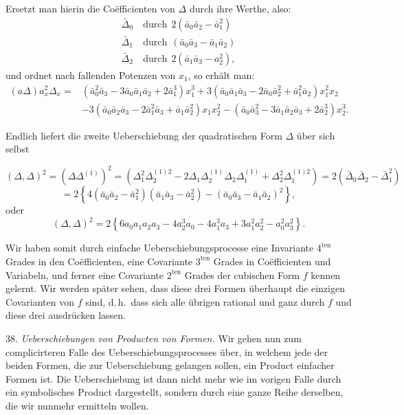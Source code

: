 \documentclass[11pt]{article}
\providecommand{\gesperrt}[1]{\textls[130]{#1}}
\providecommand{\weberpage}[1]{}
\providecommand{\weq}[2]{\begin{equation}\tag{#1}#2\end{equation}}
\let\Delta\varDelta
\begin{document}
Ersetzt man hierin die Co\"efficienten von $\Delta$ durch ihre Werthe,
also:
\[
\begin{aligned}
\bar\Delta_0 &\ \text{durch}\ \ 2(\bar a_0\bar a_2-\bar a_1^2)\\
\bar\Delta_1 &\ \text{durch}\ \ (\bar a_0\bar a_3-\bar a_1\bar a_2)\\
\bar\Delta_2 &\ \text{durch}\ \ 2(\bar a_1\bar a_3-a_2^2),
\end{aligned}
\]
und ordnet nach fallenden Potenzen von $x_1$, so erhält man:
\weq{5}{
\begin{aligned}
(a\Delta)a_x^2\Delta_x={}&(\bar a_0^2\bar a_3-3\bar a_0\bar a_1\bar a_2+2\bar a_1^3)x_1^3+3(\bar a_0\bar a_1\bar a_3-2\bar a_0\bar a_2^2+\bar a_1^2\bar a_2)x_1^2x_2\\
&-3(\bar a_0\bar a_2\bar a_3-2\bar a_1^2\bar a_3+\bar a_1\bar a_2^2)x_1x_2^2-(\bar a_0\bar a_3^2-3\bar a_1\bar a_2\bar a_3+2\bar a_2^3)x_2^3.
\end{aligned}
}

Endlich liefert die zweite Ueberschiebung der quadratischen Form
$\Delta$ über sich selbst


\weberpage{39}
\[
(\Delta, \Delta)^2=(\Delta \Delta^{(1)})^2=(\Delta_1^2\Delta_2^{(1)2}-2\Delta_1\Delta_2^{(1)}\Delta_2\Delta_1^{(1)}+\Delta_2^2\Delta_1^{(1)2})=2(\bar\Delta_0\bar\Delta_2-\bar\Delta_1^2)
\]
\[
=2\left\{4(\bar a_0\bar a_2-\bar a_1^2)(\bar a_1\bar a_3-\bar a_2^2)-(\bar a_0\bar a_3-\bar a_1\bar a_2)^2\right\},
\]
oder
\weq{6}{(\Delta, \Delta)^2=2\left\{6a_0a_1a_2a_3-4a_2^3a_0-4a_1^3a_3+3a_1^2a_2^2-a_0^2a_3^2\right\}.}

Wir haben somit durch einfache Ueberschiebungsprocesse eine
Invariante $4^{\text{ten}}$ Grades in den Co\"efficienten, eine
Covariante $3^{\text{ten}}$ Grades in Co\"efficienten und Variabeln,
und ferner eine Covariante $2^{\text{ten}}$ Grades der cubischen Form
$f$ kennen gelernt. Wir werden später sehen, dass diese drei Formen
überhaupt die einzigen \gesperrt{selbstständigen} Covarianten von $f$
sind, d.\,h.\ dass sich alle übrigen rational und ganz durch $f$ und
diese drei ausdrücken lassen.

38. \textit{Ueberschiebungen von Producten von Formen.} Wir gehen nun
zum complicirteren Falle des Ueberschiebungsprocesses über, in welchem
jede der beiden Formen, die zur Ueberschiebung gelangen sollen, ein
Product einfacher Formen ist. Die Ueberschiebung ist dann nicht mehr
wie im vorigen Falle durch ein \gesperrt{einziges} symbolisches
Product dargestellt, sondern durch eine ganze Reihe derselben, die wir
nunmehr ermitteln wollen.
\end{document}
